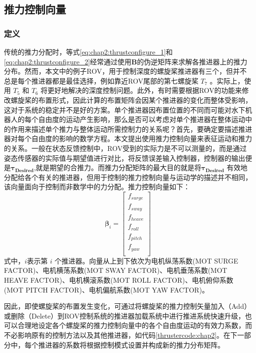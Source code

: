 \subsection{推力控制向量 }
\subsubsection{定义}
传统的推力分配时，等式\ref {eq:chap2:thrustconfigure_1}和\ref{eq:chap2:thrustconfigure_2}经常通过使用$\bm{B}$的伪逆矩阵来求解各推进器上的推力分布。然而，本文中的例子ROV，用于控制深度的螺旋桨推进器有三个，但并不总是每个推进器都是最佳选择，例如靠近ROV尾部的第七螺旋桨 $T_7$ 。实际上，使用 $T_5$ 和 $T_6$ 将更好地解决的深度控制问题。此外，有时需要根据ROV的功能来修改螺旋桨的布置形式，因此计算的布置矩阵会因某个推进器的变化而整体受影响，这对于系统的稳定并不是好的方案。单个推进器因布置位置的不同而可能对水下机器人的每个自由度的运动产生影响，那么是否可以考虑对单个推进器在整体运动中的作用来描述单个推力与整体运动所需控制力的关系呢？首先，要确定要描述推进器对每个自由度的影响的数学方程。本文提出使用推力控制向量来表征运动和推力的关系。一般在状态反馈控制中，ROV受到的实际力是不可以测量的，而是通过姿态传感器的实际值与期望值进行对比，将反馈误差输入控制器，控制器的输出便是$\bm{\tau_{Desired} }$,就是期望的合推力。而推力分配矩阵的最大目的就是将$\bm{\tau_{Desired} }$ 有效地分配给各个有关的推进器，但用于控制的推力控制向量与运动学的描述并不相同，该向量面向于控制而非数学中的力分配。推力控制向量如下\cite{ardupilot,ardusub}：
\begin{equation}
\label{eq:chap2:motor_factor}
\bm{\beta}_{i}=
\left[
\begin{array}{*{20}{c}}
  {f}_{surge}\\
  {f}_{sway}\\
  {f}_{heave}\\
  {f}_{roll}\\
  {f}_{pitch}\\
  {f}_{yaw}\\
\end{array}
\right]
\end{equation}
式中，$i$表示第 $i$ 个推进器。向量从上到下依次为电机纵荡系数(MOT SURGE FACTOR)、电机横荡系数(MOT SWAY FACTOR)、电机垂荡系数(MOT HEAVE FACTOR)、电机横滚系数(MOT ROLL FACTOR)、电机俯仰系数(MOT PITCH FACTOR)、电机偏航系数(MOT YAW FACTOR)。

因此，即使螺旋桨的布置发生变化，可通过将螺旋桨的推力控制矢量加入（Add）或删除（Delete）到ROV控制系统的推进器加载系统中进行推进系统快速升级，也可以合理地设定各个螺旋桨的推力控制向量中的各个自由度运动的有效力系数，而不必影响原有的控制方法以及其他推进器，如代码\ref{thrustercode:chap2}。在下一部分中，每个推进器的系数将根据控制模式设置并构成新的推力分布矩阵。\\

